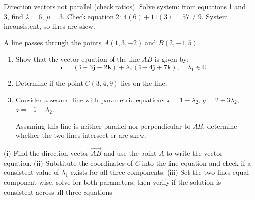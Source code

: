 \begin{solution}[Sketch]
Direction vectors not parallel (check ratios). Solve system: from equations 1 and 3, find $\lambda = 6$, $\mu = 3$. Check equation 2: $4(6) + 11(3) = 57 \neq 9$. System inconsistent, so lines are skew.
\end{solution}

\vspace{1em}

\begin{problem}
A line passes through the points $A(1, 3, -2)$ and $B(2, -1, 5)$.

\begin{enumerate}[label=(\roman*)]
    \item Show that the vector equation of the line $AB$ is given by:
    \[
    \mathbf{r} = (\mathbf{i} + 3\mathbf{j} - 2\mathbf{k}) + \lambda_1 (\mathbf{i} - 4\mathbf{j} + 7\mathbf{k}), \quad \lambda_1 \in \mathbb{R}
    \]

    \item Determine if the point $C(3, 4, 9)$ lies on the line.

    \item Consider a second line with parametric equations $x = 1 - \lambda_2$, $y = 2 + 3\lambda_2$, $z = -1 + \lambda_2$.
    
    Assuming this line is neither parallel nor perpendicular to $AB$, determine whether the two lines intersect or are skew.
\end{enumerate}
\end{problem}

\begin{hint}
(i) Find the direction vector $\overrightarrow{AB}$ and use the point $A$ to write the vector equation.
(ii) Substitute the coordinates of $C$ into the line equation and check if a consistent value of $\lambda_1$ exists for all three components.
(iii) Set the two lines equal component-wise, solve for both parameters, then verify if the solution is consistent across all three equations.
\end{hint}

